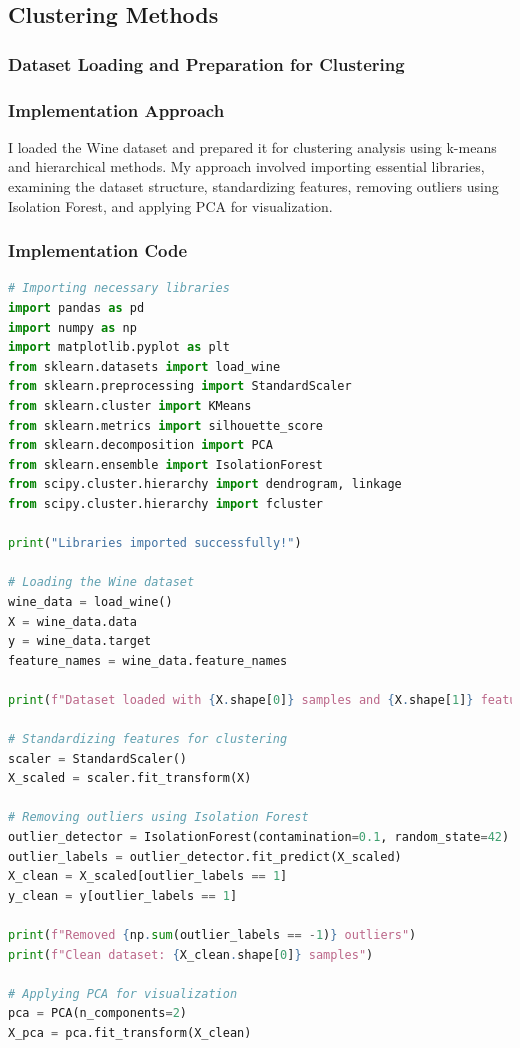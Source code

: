 \documentclass[12pt,a4paper]{article}
\begin{document}
\subsection{Clustering Methods}

\subsubsection{Dataset Loading and Preparation for Clustering}

\subsubsection{Implementation Approach}
I loaded the Wine dataset and prepared it for clustering analysis using k-means and hierarchical methods. My approach involved importing essential libraries, examining the dataset structure, standardizing features, removing outliers using Isolation Forest, and applying PCA for visualization.

\subsubsection{Implementation Code}
\begin{lstlisting}[language=Python, caption=Dataset Loading and Clustering Preparation]
# Importing necessary libraries
import pandas as pd
import numpy as np
import matplotlib.pyplot as plt
from sklearn.datasets import load_wine
from sklearn.preprocessing import StandardScaler
from sklearn.cluster import KMeans
from sklearn.metrics import silhouette_score
from sklearn.decomposition import PCA
from sklearn.ensemble import IsolationForest
from scipy.cluster.hierarchy import dendrogram, linkage
from scipy.cluster.hierarchy import fcluster

print("Libraries imported successfully!")

# Loading the Wine dataset
wine_data = load_wine()
X = wine_data.data
y = wine_data.target
feature_names = wine_data.feature_names

print(f"Dataset loaded with {X.shape[0]} samples and {X.shape[1]} features")

# Standardizing features for clustering
scaler = StandardScaler()
X_scaled = scaler.fit_transform(X)

# Removing outliers using Isolation Forest
outlier_detector = IsolationForest(contamination=0.1, random_state=42)
outlier_labels = outlier_detector.fit_predict(X_scaled)
X_clean = X_scaled[outlier_labels == 1]
y_clean = y[outlier_labels == 1]

print(f"Removed {np.sum(outlier_labels == -1)} outliers")
print(f"Clean dataset: {X_clean.shape[0]} samples")

# Applying PCA for visualization
pca = PCA(n_components=2)
X_pca = pca.fit_transform(X_clean)
\end{lstlisting}
\end{document}
